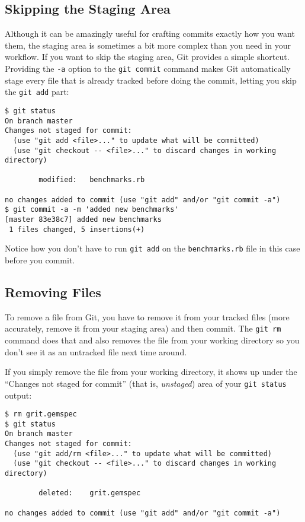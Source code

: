 \documentclass[a4paper]{book}
\begin{document}
\subsection{Skipping the Staging Area}\label{skipping-the-staging-area}

Although it can be amazingly useful for crafting commits exactly how you want them, the staging area is sometimes a bit more complex than you need in your workflow. If you want to skip the staging area, Git provides a simple shortcut. Providing the \texttt{-a} option to the \texttt{git commit} command makes Git automatically stage every file that is already tracked before doing the commit, letting you skip the \texttt{git add} part:

\begin{shaded}\begin{verbatim}
$ git status
On branch master
Changes not staged for commit:
  (use "git add <file>..." to update what will be committed)
  (use "git checkout -- <file>..." to discard changes in working directory)

        modified:   benchmarks.rb

no changes added to commit (use "git add" and/or "git commit -a")
$ git commit -a -m 'added new benchmarks'
[master 83e38c7] added new benchmarks
 1 files changed, 5 insertions(+)
\end{verbatim}\end{shaded}

Notice how you don't have to run \texttt{git add} on the \texttt{benchmarks.rb} file in this case before you commit.

\subsection{Removing Files}\label{removing-files}

To remove a file from Git, you have to remove it from your tracked files (more accurately, remove it from your staging area) and then commit. The \texttt{git rm} command does that and also removes the file from your working directory so you don't see it as an untracked file next time around.

If you simply remove the file from your working directory, it shows up under the “Changes not staged for commit” (that is, \emph{unstaged}) area of your \texttt{git status} output:

\begin{shaded}\begin{verbatim}
$ rm grit.gemspec
$ git status
On branch master
Changes not staged for commit:
  (use "git add/rm <file>..." to update what will be committed)
  (use "git checkout -- <file>..." to discard changes in working directory)

        deleted:    grit.gemspec

no changes added to commit (use "git add" and/or "git commit -a")
\end{verbatim}\end{shaded}
\end{document}
